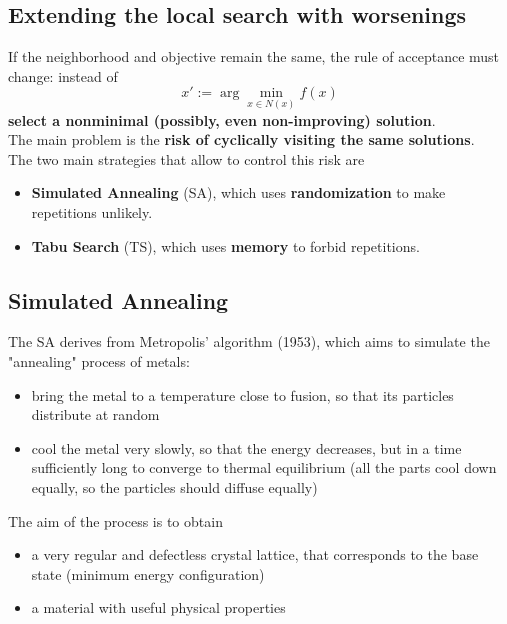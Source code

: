 
\newpage

\subsection{Extending the local search with worsenings}

If the neighborhood and objective remain the same, the rule of acceptance must change: instead of
$$ x' := \arg \min_{x\in N(x)} f (x) $$
\textbf{select a nonminimal (possibly, even non-improving) solution}.\\

The main problem is the \textbf{risk of cyclically visiting the same solutions}.\\

The two main strategies that allow to control this risk are
\begin{itemize}
	\item \textbf{Simulated Annealing} (SA), which uses \textbf{randomization} to make repetitions unlikely.\\
	
	\item \textbf{Tabu Search} (TS), which uses \textbf{memory} to forbid repetitions.\\
\end{itemize}

\newpage

\subsection{Simulated Annealing}

The SA derives from Metropolis' algorithm (1953), which aims to simulate the "annealing" process of metals:
\begin{itemize}
	\item bring the metal to a temperature close to fusion, so that its particles distribute at random
	
	\item cool the metal very slowly, so that the energy decreases, but in a time sufficiently long to converge to thermal equilibrium (all the parts cool down equally, so the particles should diffuse equally)
\end{itemize}

The aim of the process is to obtain
\begin{itemize}
	\item a very regular and defectless crystal lattice, that corresponds to the base state (minimum energy configuration)
	
	\item a material with useful physical properties
\end{itemize}

